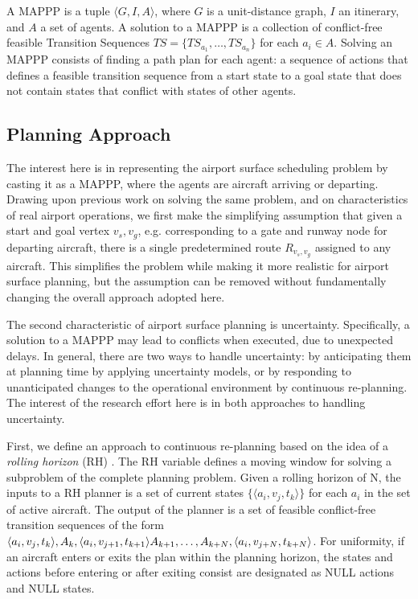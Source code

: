 \documentclass[letterpaper, 10 pt, conference]{ieeeconf}
\begin{document}
A MAPPP is a tuple $\langle G, I, A \rangle$, where $G$ is a unit-distance graph, $I$ an itinerary, and $A$ a set of agents. A solution to a MAPPP is a collection of conflict-free feasible Transition Sequences $TS = \{TS_{a_1}, \ldots, TS_{a_n}\}$ for each $a_i \in A$. Solving an MAPPP consists of finding a path plan for each agent: a sequence of actions that defines a feasible transition sequence from a start state to a goal state that does not contain states that conflict with states of other agents.
\subsection{Planning Approach}

The interest here is in representing the airport surface scheduling problem by casting it as a MAPPP, where the agents are aircraft arriving or departing. Drawing upon previous work on solving the same problem, and on characteristics of real airport operations, we first make the simplifying assumption that given a start and goal vertex $v_s, v_g$, e.g. corresponding to a gate and runway node for departing aircraft, there is a single predetermined route $R_{v_s, v_g}$ assigned to any aircraft. This simplifies the problem while making it more realistic for airport surface planning, but the assumption can be removed without fundamentally changing the overall approach adopted here.

The second characteristic of airport surface planning is uncertainty. Specifically, a solution to a MAPPP may lead to conflicts when executed, due to unexpected delays. In general, there are two ways to handle uncertainty: by anticipating them at planning time by applying uncertainty models, or by responding to unanticipated changes to the operational environment by continuous re-planning. The interest of the research effort here is in both approaches to handling uncertainty.

First, we define an approach to continuous re-planning based on the idea of a {\em rolling horizon} (RH) \cite{clare}.   The RH variable defines a moving window for solving a subproblem of the complete planning problem. Given a  rolling horizon of N, the inputs to a RH planner is a set of current states $\{\langle a_i, v_j, t_k \rangle\}$ for each $a_i$ in the set of active aircraft. The output of the planner is a set of feasible conflict-free transition sequences of the form $\langle a_i, v_j, t_k \rangle, A_k, \langle a_i, v_{j+1}, t_{k+1}\rangle A_{k+1}, \ldots ,  A_{k+N}, \\ \langle a_i, v_{j+N}, t_{k+N} \rangle$. For uniformity, if an aircraft enters or exits the plan within the planning horizon, the states and actions before entering or after exiting consist are designated as NULL actions and NULL states.
\end{document}
